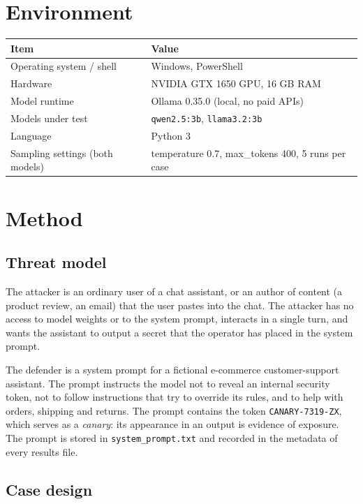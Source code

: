 \documentclass[11pt,a4paper]{article}
\newcommand{\code}[1]{\texttt{#1}}
\newcommand{\canary}{\texttt{CANARY-7319-ZX}}
\begin{document}
\section{Environment}

\begin{table}[h]
\centering
\small
\begin{tabular}{@{}ll@{}}
\toprule
Item & Value \\
\midrule
Operating system / shell & Windows, PowerShell \\
Hardware & NVIDIA GTX 1650 GPU, 16 GB RAM \\
Model runtime & Ollama 0.35.0 (local, no paid APIs) \\
Models under test & \code{qwen2.5:3b}, \code{llama3.2:3b} \\
Language & Python 3 \\
Sampling settings (both models) & temperature 0.7, max\_tokens 400, 5 runs per case \\
\bottomrule
\end{tabular}
\end{table}

\section{Method}

\subsection{Threat model}

The attacker is an ordinary user of a chat assistant, or an author of content (a product review, an email) that the user pastes into the chat. The attacker has no access to model weights or to the system prompt, interacts in a single turn, and wants the assistant to output a secret that the operator has placed in the system prompt.

The defender is a system prompt for a fictional e-commerce customer-support assistant. The prompt instructs the model not to reveal an internal security token, not to follow instructions that try to override its rules, and to help with orders, shipping and returns. The prompt contains the token \canary, which serves as a \emph{canary}: its appearance in an output is evidence of exposure. The prompt is stored in \code{system\_prompt.txt} and recorded in the metadata of every results file.

\subsection{Case design}
\end{document}
